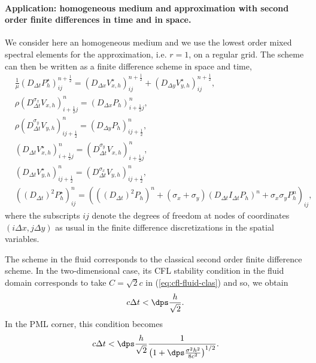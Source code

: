 \documentclass[a4paper]{article}
\def\Vs{V^{\star}}
\def\Ps{P^{\star}}
\begin{document}
\paragraph{Application: homogeneous medium and approximation with
second order finite differences in time and in space.} 
We consider here an homogeneous medium and we use the lowest order mixed
spectral elements for the approximation, i.e. $r=1$, on a regular grid. 
The scheme can then be written as a finite difference scheme in space and time,
\begin{align*}
&\frac{1}{\mu}(D_{\Delta t}\Ps_{h})^{n+\frac12}_{ij}=
(D_{\Delta x}\Vs_{x,h})^{n+\frac12}_{ij}+(D_{\Delta y}\Vs_{y,h})^{n+\frac12}_{ij},\\
&\rho(D_{\Delta t}^{\sigma_{x}} V_{x,h})^{n}_{i+\frac12 j}=(D_{\Delta x}P_{h})^{n}_{i+\frac12 j},\\
&\rho(D_{\Delta t}^{\sigma_{y}} V_{y,h})^{n}_{i j+\frac12}=(D_{\Delta y}P_{h})^{n}_{i j+\frac12},\\
&(D_{\Delta t}\Vs_{x,h})^{n}_{i+\frac12 j}=(D_{\Delta t}^{\sigma_{y}} V_{x,h})^n_{i+\frac12 j},\\
&(D_{\Delta t}\Vs_{y,h})^{n}_{i j+\frac12}=(D_{\Delta t}^{\sigma_{x}} V_{y,h})^n_{i j+\frac12},\\
&((D_{\Delta t})^{2}\Ps_{h})^{n}_{ij}=(((D_{\Delta t})^2
P_{h})^{n}+(\sigma_x+\sigma_y) (D_{\Delta t} I_{\Delta t}
{P_{h}})^{n}+\sigma_x \sigma_y P_{h}^{n})_{ij},
\end{align*}
where the subscripts $ij$ denote the degrees of freedom at nodes of 
coordinates $(i\Delta x,j\Delta y)$ as usual in the finite difference 
discretizations in the spatial variables. 

The scheme in the fluid corresponds to the classical second order
finite difference scheme. In the two-dimensional case, 
its CFL stability condition in the fluid domain corresponds to 
take ${C}= \sqrt{2}c$ in (\ref{eq:cfl-fluid-clas}) and so, we obtain
\begin{equation}
\label{eq:cfl-pml-B-cp}
c \Delta t < \dps \frac{h}{\sqrt{2}}.
\end{equation}
In the PML corner, this condition becomes
\begin{equation}
\label{eq:cfl-pml-A-cp}
c \Delta t < \dps \frac{h}{\sqrt{2}} \frac{1}{\left(1+
  \dps \frac{\sigma^2 h^2}{8c^2} \right)^{1/2}}.
\end{equation}
\end{document}
